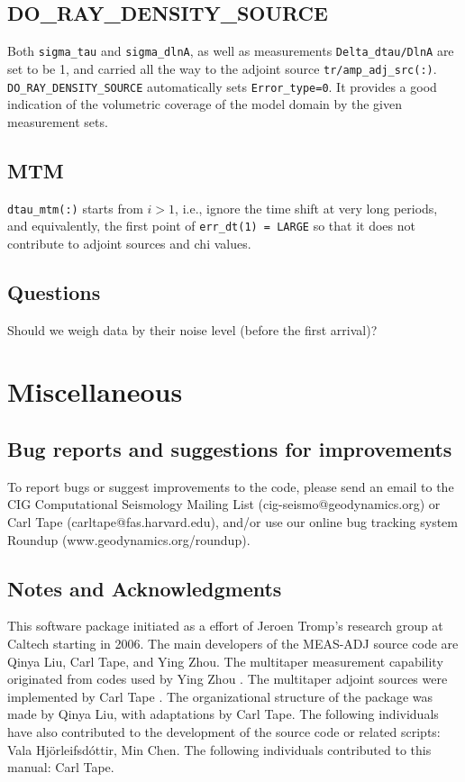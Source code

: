 \documentclass[11pt,titlepage,fleqn]{article}
\newcommand{\vala}{Hj\"{o}rleifsd\'{o}ttir}
\begin{document}
\subsection{DO\_RAY\_DENSITY\_SOURCE}
Both \verb+sigma_tau+ and \verb+sigma_dlnA+, as well as measurements \verb+Delta_dtau/DlnA+ are set to be 1, 
and carried all the way to the adjoint source \verb+tr/amp_adj_src(:)+. \verb+DO_RAY_DENSITY_SOURCE+ automatically 
sets \verb+Error_type=0+. It provides a good indication of the volumetric coverage of the model domain by the
given measurement sets.

\subsection{MTM}
\verb+dtau_mtm(:)+ starts from $i > 1$, i.e., ignore the time shift at very long periods, and equivalently,
the first point of \verb+err_dt(1) = LARGE+ so that it does not contribute to adjoint sources and chi values.

\subsection{Questions}
Should we weigh data by their noise level (before the first arrival)?

\pagebreak
\section{Miscellaneous}

\subsection{Bug reports and suggestions for improvements}

To report bugs or suggest improvements to the code, please send an email to the CIG Computational Seismology Mailing List (cig-seismo@geodynamics.org) or Carl Tape (carltape@fas.harvard.edu), and/or use our online bug tracking system Roundup (www.geodynamics.org/roundup).


\subsection{Notes and Acknowledgments}

This software package initiated as a effort of Jeroen Tromp's research group at Caltech starting in 2006.
The main developers of the MEAS-ADJ source code are Qinya Liu, Carl Tape, and Ying Zhou.
The multitaper measurement capability originated from codes used by Ying Zhou \citep[][]{YZhou2004,YZhou2005}.
The multitaper adjoint sources were implemented by Carl Tape \citep[][Appendix~C]{Tape2009phd}.
The organizational structure of the package was made by Qinya Liu, with adaptations by Carl Tape.
The following individuals have also contributed to the development of the source code or related scripts: Vala \vala, Min Chen.
The following individuals contributed to this manual: Carl Tape.
\end{document}
